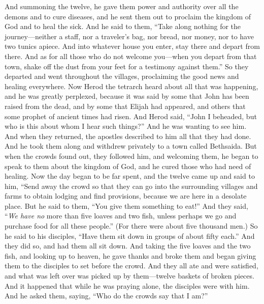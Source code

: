 \begin{biblechapter} %
 And summoning the twelve, he gave them power and authority over all the demons and to cure diseases,
\verse and he sent them out to proclaim the kingdom of God and to heal the sick.
\verse And he said to them, “Take along nothing for the journey—neither a staff, nor a traveler’s bag, nor bread, nor money, nor to have two tunics apiece.
\verse And into whatever house you enter, stay there and depart from there.
\verse And as for all those who do not welcome you—when you depart from that town, shake off the dust from your feet for a testimony against them.”
\verse So they departed and went throughout the villages, proclaiming the good news and healing everywhere.
 Now Herod the tetrarch heard about all that was happening, and he was greatly perplexed, because it was said by some that John has been raised from the dead,
\verse and by some that Elijah had appeared, and others that some prophet of ancient times had risen.
\verse And Herod said, “John I beheaded, but who is this about whom I hear such things?” And he was wanting to see him.
 And when they returned, the apostles described to him all that they had done. And he took them along and withdrew privately to a town called Bethsaida.
\verse But when the crowds found out, they followed him, and welcoming them, he began to speak to them about the kingdom of God, and he cured those who had need of healing.
\verse Now the day began to be far spent, and the twelve came up and said to him, “Send away the crowd so that they can go into the surrounding villages and farms to obtain lodging and find provisions, because we are here in a desolate place.
\verse But he said to them, “You give them something to eat!” And they said, “\textit{We have no} more than five loaves and two fish, unless perhaps we go and purchase food for all these people.”
\verse (For there were about five thousand men.) So he said to his disciples, “Have them sit down in groups of about fifty each.”
\verse And they did so, and had them all sit down.
\verse And taking the five loaves and the two fish, and looking up to heaven, he gave thanks and broke them and began giving them to the disciples to set before the crowd.
\verse And they all ate and were satisfied, and what was left over was picked up by them—twelve baskets of broken pieces.
 And it happened that while he was praying alone, the disciples were with him. And he asked them, saying, “Who do the crowds say that I am?”

\end{biblechapter}
